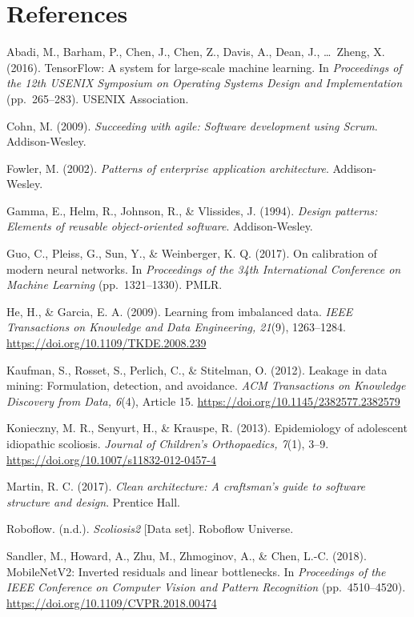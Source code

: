 \documentclass[12pt,a4paper]{article}
\begin{document}
\newpage
\section*{References}

\begin{description}[leftmargin=0.5in, labelindent=0in, itemsep=6pt, style=nextline, font=\normalfont]
\item[] Abadi, M., Barham, P., Chen, J., Chen, Z., Davis, A., Dean, J., \ldots\ Zheng, X. (2016). TensorFlow: A system for large-scale machine learning. In \emph{Proceedings of the 12th USENIX Symposium on Operating Systems Design and Implementation} (pp.\ 265--283). USENIX Association.
\item[] Cohn, M. (2009). \emph{Succeeding with agile: Software development using Scrum}. Addison-Wesley.
\item[] Fowler, M. (2002). \emph{Patterns of enterprise application architecture}. Addison-Wesley.
\item[] Gamma, E., Helm, R., Johnson, R., \& Vlissides, J. (1994). \emph{Design patterns: Elements of reusable object-oriented software}. Addison-Wesley.
\item[] Guo, C., Pleiss, G., Sun, Y., \& Weinberger, K. Q. (2017). On calibration of modern neural networks. In \emph{Proceedings of the 34th International Conference on Machine Learning} (pp.\ 1321--1330). PMLR.
\item[] He, H., \& Garcia, E. A. (2009). Learning from imbalanced data. \emph{IEEE Transactions on Knowledge and Data Engineering, 21}(9), 1263--1284. \url{https://doi.org/10.1109/TKDE.2008.239}
\item[] Kaufman, S., Rosset, S., Perlich, C., \& Stitelman, O. (2012). Leakage in data mining: Formulation, detection, and avoidance. \emph{ACM Transactions on Knowledge Discovery from Data, 6}(4), Article 15. \url{https://doi.org/10.1145/2382577.2382579}
\item[] Konieczny, M. R., Senyurt, H., \& Krauspe, R. (2013). Epidemiology of adolescent idiopathic scoliosis. \emph{Journal of Children's Orthopaedics, 7}(1), 3--9. \url{https://doi.org/10.1007/s11832-012-0457-4}
\item[] Martin, R. C. (2017). \emph{Clean architecture: A craftsman's guide to software structure and design}. Prentice Hall.
\item[] Roboflow. (n.d.). \emph{Scoliosis2} [Data set]. Roboflow Universe.
\item[] Sandler, M., Howard, A., Zhu, M., Zhmoginov, A., \& Chen, L.-C. (2018). MobileNetV2: Inverted residuals and linear bottlenecks. In \emph{Proceedings of the IEEE Conference on Computer Vision and Pattern Recognition} (pp.\ 4510--4520). \url{https://doi.org/10.1109/CVPR.2018.00474}

\end{description}
\end{document}
